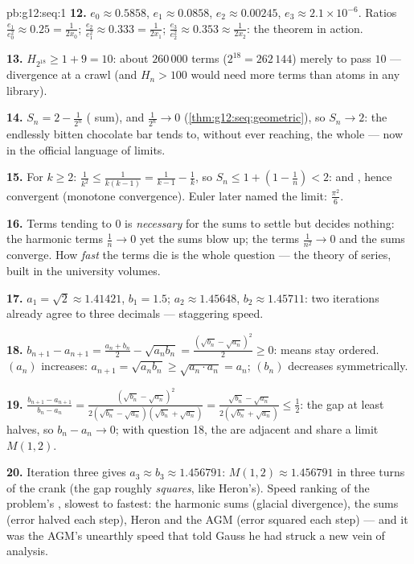 \begin{solution}{pb:g12:seq:1}
\textbf{12.} $e_0 \approx 0.5858$, $e_1 \approx 0.0858$,
$e_2 \approx 0.00245$, $e_3 \approx 2.1 \times 10^{-6}$.
Ratios $\frac{e_1}{e_0^2} \approx 0.25 = \frac{1}{2x_0}$;
$\frac{e_2}{e_1^2} \approx 0.333 = \frac{1}{2x_1}$;
$\frac{e_3}{e_2^2} \approx 0.353 \approx \frac{1}{2x_2}$: the
theorem in action.

\textbf{13.} $H_{2^{18}} \geq 1 + 9 = 10$: about
$260\,000$ terms ($2^{18} = 262\,144$) merely to pass $10$ ---
divergence at a crawl (and $H_n > 100$ would need more terms
than atoms in any library).

\textbf{14.} $S_n = 2 - \frac{1}{2^n}$ ( sum), and
$\frac{1}{2^n} \to 0$ (\cref{thm:g12:seq:geometric}), so
$S_n \to 2$: the endlessly bitten chocolate bar tends to,
without ever reaching, the whole --- now in the official
language of limits.

\textbf{15.} For $k \geq 2$:
$\frac{1}{k^2} \leq \frac{1}{k(k-1)} = \frac{1}{k-1} -
\frac1k$, so
$S_n \leq 1 + \left(1 - \frac1n\right) < 2$:  and
, hence convergent (monotone convergence). Euler
later named the limit: $\frac{\pi^2}{6}$.

\textbf{16.} Terms tending to $0$ is \emph{necessary} for the
sums to settle but decides nothing: the harmonic terms
$\frac1n \to 0$ yet the sums blow up; the terms
$\frac{1}{n^2} \to 0$ and the sums converge. How \emph{fast}
the terms die is the whole question --- the theory of series,
built in the university volumes.

\textbf{17.} $a_1 = \sqrt2 \approx 1.41421$, $b_1 = 1.5$;
$a_2 \approx 1.45648$, $b_2 \approx 1.45711$: two iterations
already agree to three decimals --- staggering speed.

\textbf{18.} $b_{n+1} - a_{n+1} = \frac{a_n + b_n}{2} -
\sqrt{a_n b_n} = \frac{(\sqrt{b_n} - \sqrt{a_n})^2}{2} \geq
0$: means stay ordered. $(a_n)$ increases:
$a_{n+1} = \sqrt{a_n b_n} \geq \sqrt{a_n \cdot a_n} = a_n$;
$(b_n)$ decreases symmetrically.

\textbf{19.} $\frac{b_{n+1} - a_{n+1}}{b_n - a_n} =
\frac{(\sqrt{b_n} - \sqrt{a_n})^2}
{2(\sqrt{b_n} - \sqrt{a_n})(\sqrt{b_n} + \sqrt{a_n})}
= \frac{\sqrt{b_n} - \sqrt{a_n}}{2(\sqrt{b_n} + \sqrt{a_n})}
\leq \frac12$: the gap at least halves, so $b_n - a_n \to 0$;
with question 18, the  are adjacent and share a limit
$M(1, 2)$.

\textbf{20.} Iteration three gives
$a_3 \approx b_3 \approx 1.456791$: $M(1, 2) \approx
1.456791$ in three turns of the crank (the gap roughly
\emph{squares}, like Heron's). Speed ranking of the problem's
, slowest to fastest: the harmonic sums (glacial
divergence), the  sums (error halved each step),
Heron and the AGM (error squared each step) --- and it was the
AGM's unearthly speed that told Gauss he had struck a new vein
of analysis.
\end{solution}
